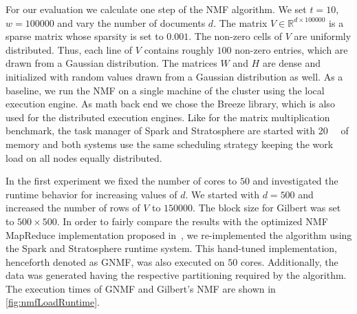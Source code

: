 For our evaluation we calculate one step of the NMF algorithm.
We set $t=10$, $w=100000$ and vary the number of documents $d$.
The matrix $V\in\mathbb{R}^{d\times 100000}$ is a sparse matrix whose sparsity is set to $0.001$.
The non-zero cells of $V$ are uniformly distributed.
Thus, each line of $V$ contains roughly $100$ non-zero entries, which are drawn from a Gaussian distribution.
The matrices $W$ and $H$ are dense and initialized with random values drawn from a Gaussian distribution as well.
As a baseline, we run the NMF on a single machine of the cluster using the local execution engine.
As math back end we chose the Breeze library, which is also used for the distributed execution engines.
Like for the matrix multiplication benchmark, the task manager of Spark and Stratosphere are started with \SI{20}{\giga\byte} of memory and both systems use the same scheduling strategy keeping the work load on all nodes equally distributed.

In the first experiment we fixed the number of cores to $50$ and investigated the runtime behavior for increasing values of $d$.
We started with $d=500$ and increased the number of rows of $V$ to $150000$.
The block size for Gilbert was set to $500 \times 500$.
In order to fairly compare the results with the optimized NMF MapReduce implementation proposed in~\cite{liu:2010a}, we re-implemented the algorithm using the Spark and Stratosphere runtime system.
This hand-tuned implementation, henceforth denoted as GNMF, was also executed on $50$ cores.
Additionally, the data was generated having the respective partitioning required by the algorithm.
The execution times of GNMF and Gilbert's NMF are shown in \cref{fig:nmfLoadRuntime}.

